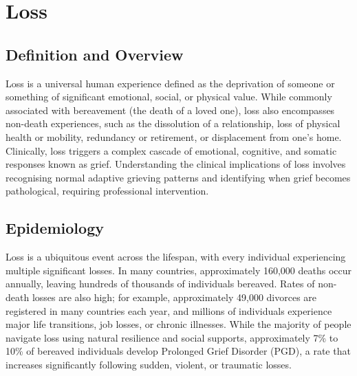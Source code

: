 \chapter{Loss}

\section*{Definition and Overview}
Loss is a universal human experience defined as the deprivation of someone or something of significant emotional, social, or physical value. While commonly associated with bereavement (the death of a loved one), loss also encompasses non-death experiences, such as the dissolution of a relationship, loss of physical health or mobility, redundancy or retirement, or displacement from one's home. Clinically, loss triggers a complex cascade of emotional, cognitive, and somatic responses known as grief. Understanding the clinical implications of loss involves recognising normal adaptive grieving patterns and identifying when grief becomes pathological, requiring professional intervention.

\section*{Epidemiology}
Loss is a ubiquitous event across the lifespan, with every individual experiencing multiple significant losses. In many countries, approximately 160,000 deaths occur annually, leaving hundreds of thousands of individuals bereaved. Rates of non-death losses are also high; for example, approximately 49,000 divorces are registered in many countries each year, and millions of individuals experience major life transitions, job losses, or chronic illnesses. While the majority of people navigate loss using natural resilience and social supports, approximately 7\% to 10\% of bereaved individuals develop Prolonged Grief Disorder (PGD), a rate that increases significantly following sudden, violent, or traumatic losses.

